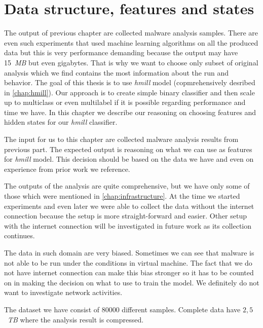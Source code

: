 \chapter{Data structure, features and states} \label{chap:data}


The output of previous chapter are collected malware analysis samples. There are even such experiments that used machine learning algorithms on all the produced data but this is very performance demanding because the output may have 15~\emph{MB} but even gigabytes. That is why we want to choose only subset of original analysis which we find contains the most information about the run and behavior. The goal of this thesis is to use \emph{hmill} model (copmrehensively desribed in \ref{chap:hmill}). Our approach is to create simple binary classifier and then scale up to multiclass or even multilabel if it is possible regarding performance and time we have. In this chapter we describe our reasoning on choosing features and hidden states for our \emph{hmill} classifier.

The input for us to this chapter are collected malware analysis results from previous part. The expected output is reasoning on what we can use as features for \emph{hmill} model. This decision should be based on the data we have and even on experience from prior work we reference.

The outputs of the analysis are quite comprehensive, but we have only some of those which were mentioned in \ref{chap:infrastructure}. At the time we started experiments and even later we were able to collect the data without the internet connection because the setup is more straight-forward and easier. Other setup with the internet connection will be investigated in future work as its collection continues. 

The data in such domain are very biased. Sometimes we can see that malware is not able to be run under the conditions in virtual machine. The fact that we do not have internet connection can make this bias stronger so it has to be counted on in making the decision on what to use to train the model. We definitely do not want to investigate network activities.

The dataset we have consist of $80000$ different samples. Complete data have \texttildelow$2,5$~\emph{TB} where the analysis result is compressed.

